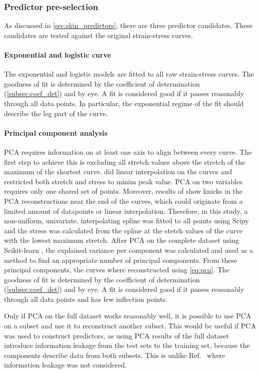\subsubsection{Predictor pre-selection}
As discussed in \cref{sec:skin_predictors}, there are three predictor candidates.
These candidates are tested against the original strain-stress curves.

\paragraph{Exponential and logistic curve}
The exponential and logistic models are fitted to all raw strain-stress curves.
The goodness of fit is determined by the coefficient of determination (\cref{subsec:coef_det}) and by eye.
A fit is considered good if it passes reasonably through all data points.
In particular, the exponential regime of the fit should describe the leg part of the curve.

\paragraph{Principal component analysis}
PCA requires information on at least one axis to align between every curve.
The first step to achieve this is excluding all stretch values above the stretch of the maximum of the shortest curve.
\textcite{Soylu2022} did linear interpolation on the curves and restricted both stretch and stress to minim peak value.
PCA on two variables requires only one shared set of points.
Moreover, results of \citeauthor{Soylu2022} show knicks in the PCA reconstructions near the end of the curves, which could originate from a limited amount of datapoints or linear interpolation.
Therefore, in this study, a non-uniform, univariate, interpolating spline was fitted to all points using Scipy \cite{2020SciPy-NMeth} and the stress was calculated from the spline at the stetch values of the curve with the lowest maximum stretch.
After PCA on the complete dataset using Scikit-learn \cite{Pedregosa2011}, the explained variance per component was calculated and used as a method to find an appropriate number of principal components.
From these principal components, the curves where reconstructed using \cref{eq:pca}.
The goodness of fit is determined by the coefficient of determination (\cref{subsec:coef_det}) and by eye.
A fit is considered good if it passes reasonably through all data points and has few inflection points.

Only if PCA on the full dataset works reasonably well, it is possible to use PCA on a subset and use it to reconstruct another subset.
This would be useful if PCA was used to construct predictors, as using PCA results of the full dataset introduce information leakage from the test sets to the training set, because the components describe data from both subsets.
This is unlike Ref.~\cite{Soylu2022} where information leakage was not considered.

